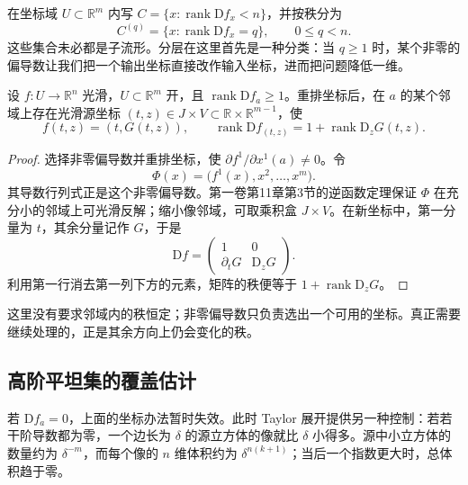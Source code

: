 在坐标域 \(U\subset\mathbb R^m\) 内写 \(C=\{x:\operatorname{rank}\mathrm{D}f_x<n\}\)，并按秩分为
\[
	C^{(q)}=\{x:\operatorname{rank}\mathrm{D}f_x=q\},\qquad 0\le q<n.
\]
这些集合未必都是子流形。分层在这里首先是一种分类：当 \(q\ge1\) 时，某个非零的偏导数让我们把一个输出坐标直接改作输入坐标，进而把问题降低一维。

\begin{lemma}\label{g2:lem:sard-rank-reduction}
	设 \(f:U\to\mathbb R^n\) 光滑，\(U\subset\mathbb R^m\) 开，且 \(\operatorname{rank}\mathrm{D}f_a\ge1\)。重排坐标后，在 \(a\) 的某个邻域上存在光滑源坐标 \((t,z)\in J\times V\subset\mathbb R\times\mathbb R^{m-1}\)，使
	\[
		f(t,z)=(t,G(t,z)),\qquad
		\operatorname{rank}\mathrm{D}f_{(t,z)}=1+\operatorname{rank}\mathrm{D}_zG(t,z).
	\]
\end{lemma}
\begin{proof}
	选择非零偏导数并重排坐标，使 \(\partial f^1/\partial x^1(a)\ne0\)。令
	\[
		\Phi(x)=\bigl(f^1(x),x^2,\ldots,x^m\bigr).
	\]
	其导数行列式正是这个非零偏导数。第一卷第11章第3节的逆函数定理保证 \(\Phi\) 在充分小的邻域上可光滑反解；缩小像邻域，可取乘积盒 \(J\times V\)。在新坐标中，第一分量为 \(t\)，其余分量记作 \(G\)，于是
	\[
		\mathrm{D}f=\begin{pmatrix}1&0\\\partial_tG&\mathrm{D}_zG\end{pmatrix}.
	\]
	利用第一行消去第一列下方的元素，矩阵的秩便等于 \(1+\operatorname{rank}\mathrm{D}_zG\)。
\end{proof}

这里没有要求邻域内的秩恒定；非零偏导数只负责选出一个可用的坐标。真正需要继续处理的，正是其余方向上仍会变化的秩。

\subsection{高阶平坦集的覆盖估计}
\label{g2:subsec:1402:02}

若 \(\mathrm{D}f_a=0\)，上面的坐标办法暂时失效。此时 Taylor 展开提供另一种控制：若若干阶导数都为零，一个边长为 \(\delta\) 的源立方体的像就比 \(\delta\) 小得多。源中小立方体的数量约为 \(\delta^{-m}\)，而每个像的 \(n\) 维体积约为 \(\delta^{n(k+1)}\)；当后一个指数更大时，总体积趋于零。


